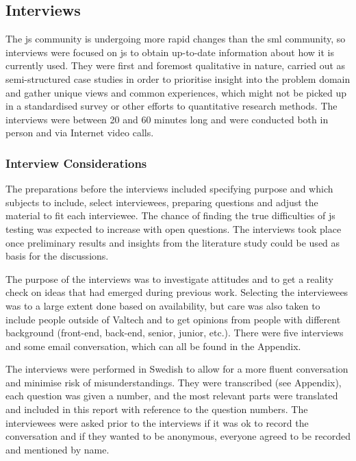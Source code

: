 \documentclass[11pt]{article}
\begin{document}
\subsection{Interviews}

The \gls{js} community is undergoing more rapid changes than the \gls{sml} community, so interviews were focused on \gls{js} to obtain up-to-date information about how it is currently used. They were first and foremost qualitative in nature, carried out as semi-structured case studies in order to prioritise insight into the problem domain and gather unique views and common experiences, which might not be picked up in a standardised survey or other efforts to quantitative research methods. The interviews were between 20 and 60 minutes long and were conducted both in person and via Internet video calls.

\subsubsection{Interview Considerations}

The preparations before the interviews included specifying purpose and which subjects to include, select interviewees, preparing questions and adjust the material to fit each interviewee. The chance of finding the true difficulties of \gls{js} testing was expected to increase with open questions. The interviews took place once preliminary results and insights from the literature study could be used as basis for the discussions.

The purpose of the interviews was to investigate attitudes and to get a reality check on ideas that had emerged during previous work. Selecting the interviewees was to a large extent done based on availability, but care was also taken to include people outside of Valtech and to get opinions from people with different background (front-end, back-end, senior, junior, etc.). There were five interviews and some email conversation, which can all be found in the Appendix.

The interviews were performed in Swedish to allow for a more fluent conversation and minimise risk of misunderstandings. They were transcribed (see Appendix), each question was given a number, and the most relevant parts were translated and included in this report with reference to the question numbers. The interviewees were asked prior to the interviews if it was ok to record the conversation and if they wanted to be anonymous, everyone agreed to be recorded and mentioned by name.
\end{document}
